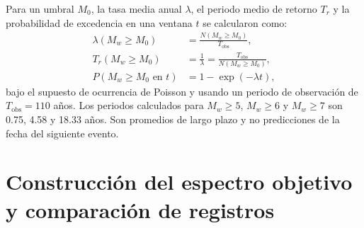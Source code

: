 \documentclass[12pt,oneside]{report}
\begin{document}
Para un umbral $M_0$, la tasa media anual $\lambda$, el periodo medio de retorno
$T_r$ y la probabilidad de excedencia en una ventana $t$ se calcularon como:
\begin{align}
    \lambda(M_w\geq M_0)&=\frac{N(M_w\geq M_0)}{T_{\mathrm{obs}}},\\
    T_r(M_w\geq M_0)&=\frac{1}{\lambda}
    =\frac{T_{\mathrm{obs}}}{N(M_w\geq M_0)},\\
    P(M_w\geq M_0\text{ en }t)&=1-\exp(-\lambda t),
\end{align}
bajo el supuesto de ocurrencia de Poisson y usando un periodo de observación
de $T_{\mathrm{obs}}=110$ años. Los periodos calculados para $M_w\geq5$, $M_w\geq6$
y $M_w\geq7$ son 0.75, 4.58 y 18.33 años. Son promedios de largo plazo y no
predicciones de la fecha del siguiente evento.

\section{Construcción del espectro objetivo y comparación de registros}
\label{app:espectros}
\end{document}
